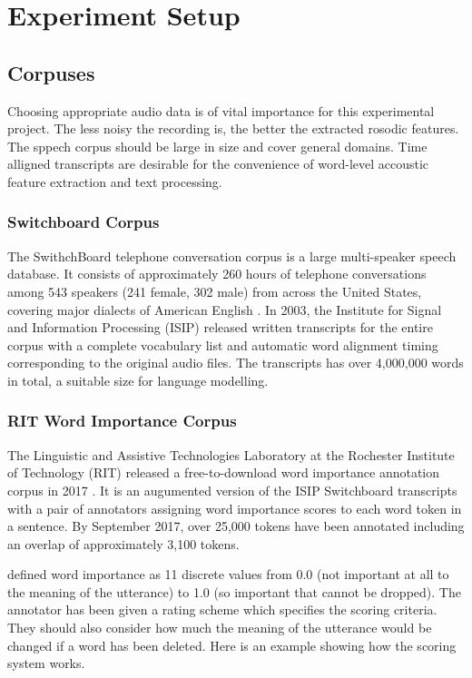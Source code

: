 \chapter{Experiment Setup}

\section{Corpuses}
Choosing appropriate audio data is of vital importance for this experimental project. The less noisy the recording is, the better the extracted rosodic features. The sppech corpus should be large in size and cover general domains. Time alligned transcripts are desirable for the convenience of word-level accoustic feature extraction and text processing. 

\subsection{Switchboard Corpus}
The SwithchBoard telephone conversation corpus is a large multi-speaker speech database. It consists of approximately 260 hours of telephone conversations among 543 speakers (241 female, 302 male) from across the United States, covering major dialects of American English\citep{Godfrey1992} . In 2003, the Institute for Signal and Information Processing (ISIP) released written transcripts for the entire corpus with a complete vocabulary list and automatic word alignment timing corresponding to the original audio files. The transcripts has over 4,000,000 words in total, a suitable size for language modelling.


\subsection{RIT Word Importance Corpus}
The Linguistic and Assistive Technologies Laboratory at the Rochester Institute of Technology (RIT) released a free-to-download word importance annotation corpus in 2017  \citep{Kafle2018}. It is an augumented version of the ISIP Switchboard transcripts with a pair of annotators assigning word importance scores to each word token in a sentence. By September 2017, over 25,000 tokens have been annotated including an overlap of approximately 3,100 tokens. 

\citet{Kafle2018} defined word importance as 11 discrete values from 0.0 (not important
at all to the meaning of the utterance) to 1.0 (so important that cannot be dropped). The annotator has been given a rating scheme which specifies the scoring criteria. They should also consider how much the meaning of the utterance would be changed if a word has been deleted. Here is an example showing how the scoring system works.

